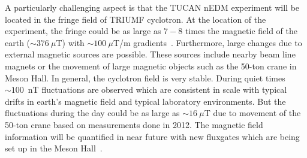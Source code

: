 
A particularly challenging aspect is that the TUCAN nEDM experiment will be located in the fringe field of TRIUMF cyclotron. At the location of the experiment, the fringe could be as large as $7-8$ times the magnetic field of the earth ($\sim376~\mu$T) with $\sim100~\mu$T/m gradients~\cite{sarte}. Furthermore, large changes due to external magnetic sources are possible. These sources include nearby beam line magnets or the movement of large magnetic objects such as the 50-ton crane in Meson Hall. In general, the cyclotron field is very stable. During quiet times  $\sim100$~nT fluctuations are observed which are consistent in scale with typical drifts in earth's magnetic field and typical laboratory environments. But the fluctuations during the day could be as large as  $\sim16~\mu$T due to movement of the 50-ton crane based on measurements done in 2012. The magnetic field information will be quantified in near future with new fluxgates which are being set up in the Meson Hall~\cite{beapriv}.








